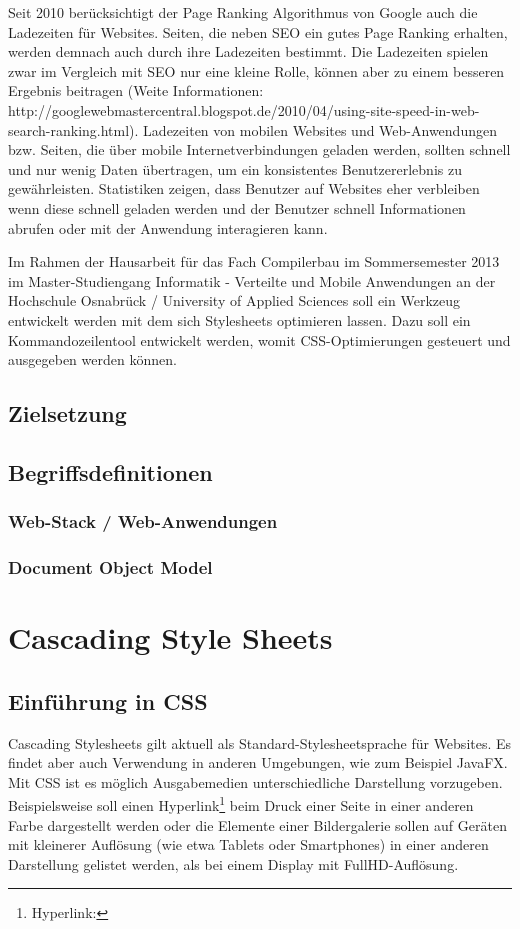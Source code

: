 \documentclass[11pt]{scrartcl}
\begin{document}
Seit 2010 berücksichtigt der Page Ranking Algorithmus von Google auch die Ladezeiten für Websites. Seiten, die neben SEO ein gutes Page Ranking erhalten, werden demnach auch durch ihre Ladezeiten bestimmt. Die Ladezeiten spielen zwar im Vergleich mit SEO nur eine kleine Rolle, können aber zu einem besseren Ergebnis beitragen (Weite Informationen: http://googlewebmastercentral.blogspot.de/2010/04/using-site-speed-in-web-search-ranking.html).
Ladezeiten von mobilen Websites und Web-Anwendungen bzw. Seiten, die über mobile Internetverbindungen geladen werden, sollten schnell und nur wenig Daten übertragen, um ein konsistentes Benutzererlebnis zu gewährleisten. Statistiken zeigen, dass Benutzer auf Websites eher verbleiben wenn diese schnell geladen werden und der Benutzer schnell Informationen abrufen oder mit der Anwendung interagieren kann.

Im Rahmen der Hausarbeit für das Fach Compilerbau im Sommersemester 2013 im Master-Studiengang Informatik - Verteilte und Mobile Anwendungen an der Hochschule Osnabrück / University of Applied Sciences soll ein Werkzeug entwickelt werden mit dem sich Stylesheets optimieren lassen. Dazu soll ein Kommandozeilentool entwickelt werden, womit CSS-Optimierungen gesteuert und ausgegeben werden können. 
\subsection{Zielsetzung}
\subsection{Begriffsdefinitionen}
\subsubsection{Web-Stack / Web-Anwendungen}
\subsubsection{Document Object Model}

\pagebreak
\section{Cascading Style Sheets}
\subsection{Einführung in CSS}

Cascading Stylesheets gilt aktuell als Standard-Stylesheetsprache für Websites. Es findet aber auch Verwendung in anderen Umgebungen, wie zum Beispiel JavaFX. Mit CSS ist es möglich Ausgabemedien unterschiedliche Darstellung vorzugeben. Beispielsweise soll einen Hyperlink\footnote{Hyperlink:} beim Druck einer Seite in einer anderen Farbe dargestellt werden oder die Elemente einer Bildergalerie sollen auf Geräten mit kleinerer Auflösung (wie etwa Tablets oder Smartphones) in einer anderen Darstellung gelistet werden, als bei einem Display mit FullHD-Auflösung.  
\end{document}
